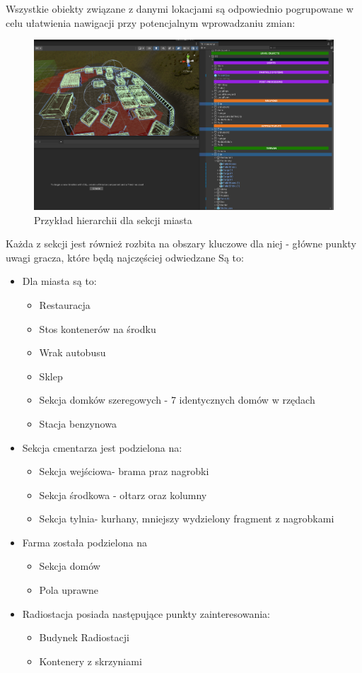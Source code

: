 Wszystkie obiekty związane z danymi lokacjami są odpowiednio pogrupowane w celu ułatwienia nawigacji przy potencjalnym wprowadzaniu zmian:
\begin{figure}[h]
    \centering
    \includegraphics[width=1\linewidth]{Images/cityexamplehierarchy.png}
    \caption{Przykład hierarchii dla sekcji miasta}
    \label{fig:enter-label}
\end{figure}
Każda z sekcji jest również rozbita na obszary kluczowe dla niej - główne punkty uwagi gracza, które będą najczęściej odwiedzane
Są to:
\begin{itemize}
    \item Dla miasta są to:
    \begin{itemize}
        \item Restauracja
        \item Stos kontenerów na środku
        \item Wrak autobusu
        \item Sklep
        \item Sekcja domków szeregowych - 7 identycznych domów w rzędach
        \item Stacja benzynowa
    \end{itemize}
    \item Sekcja cmentarza jest podzielona na:
    \begin{itemize}
        \item Sekcja wejściowa- brama praz nagrobki
        \item Sekcja środkowa - ołtarz oraz kolumny
        \item Sekcja tylnia- kurhany, mniejszy wydzielony fragment z nagrobkami
    \end{itemize}
    \item Farma została podzielona na
    \begin{itemize}
        \item Sekcja domów
        \item Pola uprawne
    \end{itemize}
    \item Radiostacja posiada następujące punkty zainteresowania:
    \begin{itemize}
        \item Budynek Radiostacji
        \item Kontenery z skrzyniami
    \end{itemize}
\end{itemize}

